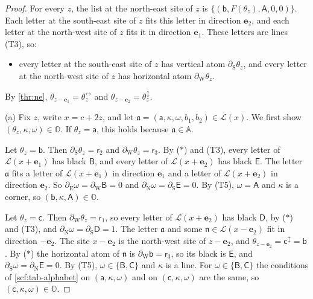 \begin{proof}
For every $z$, the list at the north-east site of $z$ is $\{(\mathsf b,F(\theta_z),\mathsf A,0,0)\}$. Each letter at the south-east site of $z$ fits this letter in direction $\mathbf e_2$, and each letter at the north-west site of $z$ fits it in direction $\mathbf e_1$. These letters are lines (T3), so:
\begin{itemize}
\item[($\ast$)] every letter at the south-east site of $z$ has vertical atom $\partial_{\mathrm S}\theta_z$, and every letter at the north-west site of $z$ has horizontal atom $\partial_{\mathrm W}\theta_z$.
\end{itemize}
By \cref{thr:ne}, $\theta_{z-\mathbf e_1}=\theta_z^{\leftrightarrow}$ and $\theta_{z-\mathbf e_2}=\theta_z^{\updownarrow}$.

(a) Fix $z$, write $x=c+2z$, and let $\mathfrak a=(\mathsf a,\kappa,\omega,b_1,b_2)\in\mathcal L(x)$. We first show $(\theta_z,\kappa,\omega)\in\mathbb O$. If $\theta_z=\mathsf a$, this holds because $\mathfrak a\in\mathbb A$.

Let $\theta_z=\mathsf b$. Then $\partial_{\mathrm S}\theta_z=\mathsf r_2$ and $\partial_{\mathrm W}\theta_z=\mathsf r_3$. By ($\ast$) and (T3), every letter of $\mathcal L(x+\mathbf e_1)$ has black $\mathsf B$, and every letter of $\mathcal L(x+\mathbf e_2)$ has black $\mathsf E$. The letter $\mathfrak a$ fits a letter of $\mathcal L(x+\mathbf e_1)$ in direction $\mathbf e_1$ and a letter of $\mathcal L(x+\mathbf e_2)$ in direction $\mathbf e_2$. So $\partial_{\mathrm E}\omega=\partial_{\mathrm W}\mathsf B=0$ and $\partial_{\mathrm N}\omega=\partial_{\mathrm S}\mathsf E=0$. By (T5), $\omega=\mathsf A$ and $\kappa$ is a corner, so $(\mathsf b,\kappa,\mathsf A)\in\mathbb O$.

Let $\theta_z=\mathsf c$. Then $\partial_{\mathrm W}\theta_z=\mathsf r_1$, so every letter of $\mathcal L(x+\mathbf e_2)$ has black $\mathsf D$, by ($\ast$) and (T3), and $\partial_{\mathrm N}\omega=\partial_{\mathrm S}\mathsf D=1$. The letter $\mathfrak a$ and some $\mathfrak n\in\mathcal L(x-\mathbf e_2)$ fit in direction $-\mathbf e_2$. The site $x-\mathbf e_2$ is the north-west site of $z-\mathbf e_2$, and $\theta_{z-\mathbf e_2}=\mathsf c^{\updownarrow}=\mathsf b$. By ($\ast$) the horizontal atom of $\mathfrak n$ is $\partial_{\mathrm W}\mathsf b=\mathsf r_3$, so its black is $\mathsf E$, and $\partial_{\mathrm S}\omega=\partial_{\mathrm N}\mathsf E=0$. By (T5), $\omega\in\{\mathsf B,\mathsf C\}$ and $\kappa$ is a line. For $\omega\in\{\mathsf B,\mathsf C\}$ the conditions of \cref{scf:tab-alphabet} on $(\mathsf a,\kappa,\omega)$ and on $(\mathsf c,\kappa,\omega)$ are the same, so $(\mathsf c,\kappa,\omega)\in\mathbb O$.


\end{proof}
